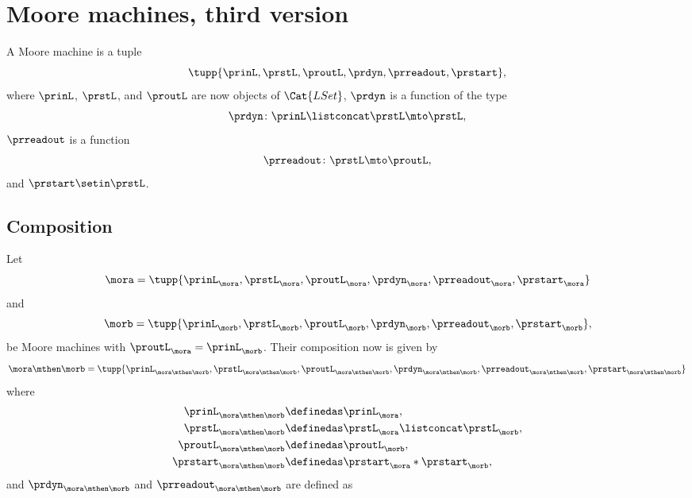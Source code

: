 
\section{Moore machines, third version}

\begin{definition}
    \label{def:moore_machine_3rd}
    A Moore machine is a tuple
    \begin{equation}
        \label{eq:moore-tuple-improved-again}
        \tupp{\prinL,\prstL,\proutL,\prdyn,\prreadout,\prstart},
    \end{equation}
    where $\prinL$, $\prstL$, and $\proutL$ are now objects of $\Cat{LSet}$, $\prdyn$ is a function of the type
    \begin{equation}
        \prdyn \colon \prinL \listconcat \prstL \mto \prstL,
    \end{equation}
    $\prreadout$ is a function
    \begin{equation}
        \prreadout \colon \prstL \mto \proutL,
    \end{equation}
    and $\prstart \setin \prstL$.
\end{definition}

\subsection{Composition}

Let
\begin{equation}
    \label{eq:moore-mora-3rd}
    \mora = \tupp{\prinL_{\mora},\prstL_{\mora},\proutL_{\mora},\prdyn_{\mora},\prreadout_{\mora},\prstart_{\mora}}
\end{equation}
%
and
%
\begin{equation}
    \label{eq:moore-morb-3rd}
    \morb = \tupp{\prinL_{\morb},\prstL_{\morb},\proutL_{\morb},\prdyn_{\morb},\prreadout_{\morb},\prstart_{\morb}},
\end{equation}
be Moore machines with $\proutL_{\mora} = \prinL_{\morb}$.
Their composition now is given by
\begin{equation}
    \mora \mthen \morb = \tupp{\prinL_{\mora \mthen \morb},\prstL_{\mora \mthen \morb},\proutL_{\mora \mthen \morb},\prdyn_{\mora \mthen \morb},\prreadout_{\mora \mthen \morb},\prstart_{\mora \mthen \morb}}
\end{equation}
where
%
\begin{equation}
    \label{eq:moore-comp-3rd-1}
    \begin{aligned}
        \prinL_{\mora\mthen\morb}   & \definedas \prinL_{\mora}, \\
        \prstL_{\mora\mthen\morb}   & \definedas \prstL_{\mora} \listconcat  \prstL_{\morb}, \\
        \proutL_{\mora\mthen\morb}  & \definedas \proutL_{\morb}, \\
        \prstart_{\mora\mthen\morb} & \definedas \prstart_{\mora} * \prstart_{\morb},
    \end{aligned}
\end{equation}
and $\prdyn_{\mora \mthen \morb}$ and $\prreadout_{\mora \mthen \morb}$ are defined as

